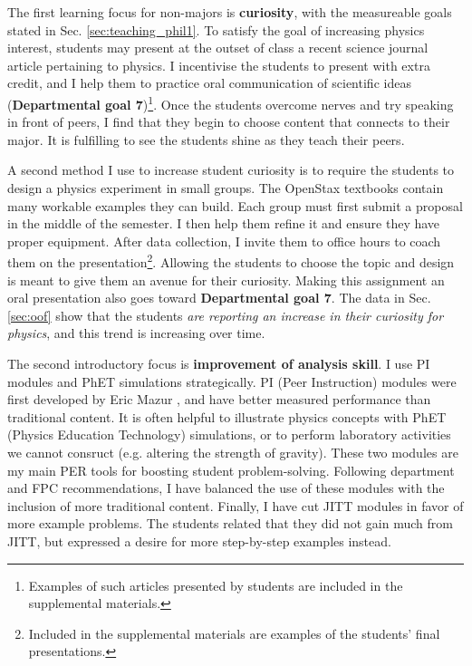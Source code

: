 \documentclass[../../../main.tex]{subfiles}
\begin{document}
The first learning focus for non-majors is \textbf{curiosity}, with the measureable goals stated in Sec. \ref{sec:teaching_phil1}.  To satisfy the goal of increasing physics interest, students may present at the outset of class a recent science journal article pertaining to physics.  I incentivise the students to present with extra credit, and I help them to practice oral communication of scientific ideas (\textbf{Departmental goal 7})\footnote{Examples of such articles presented by students are included in the supplemental materials.}.  Once the students overcome nerves and try speaking in front of peers, I find that they begin to choose content that connects to their major.  It is fulfilling to see the students shine as they teach their peers.  \\ \hspace{0.1cm}

A second method I use to increase student curiosity is to require the students to design a physics experiment in small groups.  The OpenStax textbooks contain many workable examples they can build.  Each group must first submit a proposal in the middle of the semester.  I then help them refine it and ensure they have proper equipment.  After data collection, I invite them to office hours to coach them on the presentation\footnote{Included in the supplemental materials are examples of the students' final presentations.}.  Allowing the students to choose the topic and design is meant to give them an avenue for their curiosity.  Making this assignment an oral presentation also goes toward \textbf{Departmental goal 7}.  The data in Sec. \ref{sec:oof} show that the students \textit{are reporting an increase in their curiosity for physics}, and this trend is increasing over time. \\ \hspace{0.1cm}

The second introductory focus is \textbf{improvement of analysis skill}.  I use PI modules and PhET simulations strategically.  PI (Peer Instruction) modules were first developed by Eric Mazur \cite{mazur2013peer}, and have better measured performance than traditional content.  It is often helpful to illustrate physics concepts with PhET (Physics Education Technology) simulations, or to perform laboratory activities we cannot consruct (e.g. altering the strength of gravity)\cite{phet}.  These two modules are my main PER tools for boosting student problem-solving.  Following department and FPC recommendations, I have balanced the use of these modules with the inclusion of more traditional content.  Finally, I have cut JITT modules \cite{jitt} in favor of more example problems.  The students related that they did not gain much from JITT, but expressed a desire for more step-by-step examples instead.  \\ \hspace{0.1cm}
\end{document}
